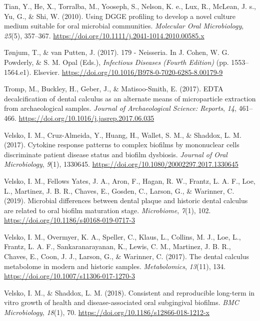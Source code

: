 \documentclass[
  b5paper,
]{book}
\newlength{\cslhangindent}
\newenvironment{CSLReferences}[2] %
 {\begin{list}{}{%
  \setlength{\itemindent}{0pt}
  \setlength{\leftmargin}{0pt}
  \setlength{\parsep}{0pt}
  \ifodd #1
   \setlength{\leftmargin}{\cslhangindent}
   \setlength{\itemindent}{-1\cslhangindent}
  \fi
  \setlength{\itemsep}{#2\baselineskip}}}
 {\end{list}}
\begin{document}
\begin{CSLReferences}{1}{0}
Tian, Y., He, X., Torralba, M., Yooseph, S., Nelson, K. e., Lux, R.,
McLean, J. s., Yu, G., \& Shi, W. (2010). Using {DGGE} profiling to
develop a novel culture medium suitable for oral microbial communities.
\emph{Molecular Oral Microbiology}, \emph{25}(5), 357--367.
\url{https://doi.org/10.1111/j.2041-1014.2010.00585.x}

Tønjum, T., \& van Putten, J. (2017). 179 - {Neisseria}. In J. Cohen, W.
G. Powderly, \& S. M. Opal (Eds.), \emph{Infectious {Diseases} ({Fourth
Edition})} (pp. 1553--1564.e1). {Elsevier}.
\url{https://doi.org/10.1016/B978-0-7020-6285-8.00179-9}

Tromp, M., Buckley, H., Geber, J., \& Matisoo-Smith, E. (2017). {EDTA}
decalcification of dental calculus as an alternate means of
microparticle extraction from archaeological samples. \emph{Journal of
Archaeological Science: Reports}, \emph{14}, 461--466.
\url{https://doi.org/10.1016/j.jasrep.2017.06.035}

Velsko, I. M., Cruz-Almeida, Y., Huang, H., Wallet, S. M., \& Shaddox,
L. M. (2017). Cytokine response patterns to complex biofilms by
mononuclear cells discriminate patient disease status and biofilm
dysbiosis. \emph{Journal of Oral Microbiology}, \emph{9}(1), 1330645.
\url{https://doi.org/10.1080/20002297.2017.1330645}

Velsko, I. M., Fellows Yates, J. A., Aron, F., Hagan, R. W., Frantz, L.
A. F., Loe, L., Martinez, J. B. R., Chaves, E., Gosden, C., Larson, G.,
\& Warinner, C. (2019). Microbial differences between dental plaque and
historic dental calculus are related to oral biofilm maturation stage.
\emph{Microbiome}, \emph{7}(1), 102.
\url{https://doi.org/10.1186/s40168-019-0717-3}

Velsko, I. M., Overmyer, K. A., Speller, C., Klaus, L., Collins, M. J.,
Loe, L., Frantz, L. A. F., Sankaranarayanan, K., Lewis, C. M., Martinez,
J. B. R., Chaves, E., Coon, J. J., Larson, G., \& Warinner, C. (2017).
The dental calculus metabolome in modern and historic samples.
\emph{Metabolomics}, \emph{13}(11), 134.
\url{https://doi.org/10.1007/s11306-017-1270-3}

Velsko, I. M., \& Shaddox, L. M. (2018). Consistent and reproducible
long-term in vitro growth of health and disease-associated oral
subgingival biofilms. \emph{BMC Microbiology}, \emph{18}(1), 70.
\url{https://doi.org/10.1186/s12866-018-1212-x}


\end{CSLReferences}
\end{document}
